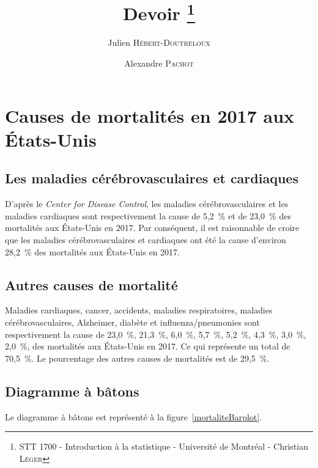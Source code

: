 \documentclass[10pt,twocolumn]{article}
\title{Devoir \no 1\thanks{STT 1700 - Introduction à la statistique - Université de Montréal - Christian \textsc{Léger}}}
\author{Julien \textsc{Hébert-Doutreloux} \and Alexandre \textsc{Pachot}}
\begin{document}

\maketitle
\tableofcontents



\section{Causes de mortalités en 2017 aux États-Unis}
\subsection{Les maladies cérébrovasculaires et cardiaques}
D’après le \textit{Center for Disease Control}, les maladies cérébrovasculaires et les maladies cardiaques sont respectivement la cause de 5,2~\% et de 23,0~\% des mortalités aux États-Unis en 2017. Par conséquent, il est raisonnable de croire que les maladies cérébrovasculaires et cardiaques ont été la cause d’environ 28,2~\% des mortalités aux États-Unis en 2017.


\subsection{Autres causes de mortalité}
Maladies cardiaques, cancer, accidents, maladies respiratoires, maladies cérébrovasculaires, Alzheimer, diabète et influenza/pneumonies sont respectivement la cause de 23,0~\%, 21,3~\%, 6,0~\%, 5,7~\%, 5,2~\%, 4,3~\%, 3,0~\%, 2,0~\%, des mortalités aux États-Unis en 2017. Ce qui représente un total de 70,5~\%. Le pourcentage des autres causes de mortalités est de 29,5~\%.


\subsection{Diagramme à bâtons}
Le diagramme à bâtons est représenté à la figure~\ref{mortaliteBarplot}.
\end{document}
